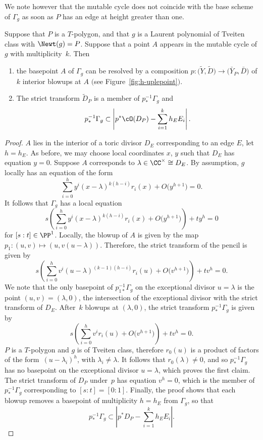 We note however that the mutable cycle does not coincide with the base scheme of $\Gamma_g$ as soon as $P$ has an edge at height greater than one.
\begin{Lemma}\label{lem:resolutionofsingularities}
Suppose that $P$ is a $T$-polygon, and that $g$ is a Laurent polynomial of Tveiten class with $\Newt(g)=P$. Suppose that a point $A$ appears in the mutable cycle of $g$ with multiplicity~$k$. Then
\begin{enumerate}\itemsep=0pt
	\item[$(1)$] the basepoint $A$ of $\Gamma_g$ can be resolved by a composition $p \colon \bigl(\tilde{Y}, \tilde{D}\bigr) \rightarrow \bigl(\bar{Y}_P, \bar{D}\bigr)$ of $k$ interior blowups at $A$ $($see Figure~{\rm\ref{fig:h-uplepoint}}$)$.
	\item[$(2)$] The strict transform $\tilde{D}_P$ is a member of $p_*^{-1}\Gamma_g$ and
	\[p_*^{-1}\Gamma_g \subset \left|p^*\cO(D_P)-\sum_{i=1}^{k} h_E E_i\right|.
	\]
\end{enumerate}
\end{Lemma}
\begin{proof}
$A$ lies in the interior of a toric divisor $D_E$ corresponding to an edge $E$, let $h=h_E$.
As before, we may choose local coordinates $x$, $y$ such that $D_E$ has equation $y=0$. Suppose $A$ corresponds to $\lambda \in \CC^\times \cong D_E$. By assumption, $g$ locally has an equation of the form
\[
\sum_{i=0}^h y^i(x-\lambda)^{k(h-i)}r_i(x)+O\bigl(y^{h+1}\bigr)=0.
\]
It follows that $\Gamma_g$ has a local equation
\[
s\left(\sum_{i=0}^h y^i(x-\lambda)^{k(h-i)}r_i(x)+O\bigl(y^{h+1}\bigr)\right)+ty^h=0
\]
for $[s:t]\in \PP^1$.
Locally, the blowup of $A$ is given by the map $p_1 \colon (u,v) \mapsto (u, v(u-\lambda))$. Therefore, the strict transform of the pencil is given by
 \[
s\left(\sum_{i=0}^h v^i(u-\lambda)^{(k-1)(h-i)}r_i(u)+O\bigl(v^{h+1}\bigr)\right)+tv^h=0.
 \]
We note that the only basepoint of $p_{1*}^{-1}\Gamma_g$ on the exceptional divisor $u=\lambda$ is the point ${(u,v)=(\lambda, 0)}$, the intersection of the exceptional divisor with the strict transform of $D_E$.
After~$k$ blowups at $(\lambda, 0)$, the strict transform $p_*^{-1}\Gamma_g$ is given by
 \[
 s\left(\sum_{i=0}^h v^ir_i(u)+O\bigl(v^{h+1}\bigr)\right)+tv^h=0.
 \]
 $P$ is a $T$-polygon and $g$ is of Tveiten class, therefore $r_0(u)$ is a product of factors of the form~${(u-\lambda_i)^h}$, with $\lambda_i \neq \lambda$. It follows that $r_0(\lambda) \neq 0$, and so $p_*^{-1}\Gamma_g$ has no basepoint on the exceptional divisor $u=\lambda$, which proves the first claim.
The strict transform of $D_P$ under~$p$ has equation $v^h=0$, which is the member of $p_{*}^{-1}\Gamma_g$ corresponding to $[s:t]=[0:1]$. Finally, the proof shows that each blowup removes a basepoint of multiplicity $h=h_E$ from $\Gamma_g$, so that%
	\[
	p_*^{-1}\Gamma_g \subset \left|p^*D_P-\sum_{i=1}^{k} h_E E_i\right|.\tag*{\qed}
\] \renewcommand{\qed}{}
\end{proof}

